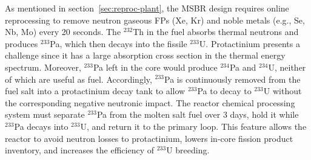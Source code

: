 As mentioned in section~\ref{sec:reproc-plant}, the \gls{MSBR} design 
requires online reprocessing to remove neutron gaseous \glspl{FP} (Xe, Kr) and 
noble metals (e.g., Se, Nb, Mo) every 20 seconds.  The $^{232}$Th in the fuel 
absorbs thermal neutrons and produces $^{233}$Pa, which then decays into the 
fissile $^{233}$U. Protactinium presents a challenge since it has a large 
absorption cross section in the thermal energy spectrum. Moreover, $^{233}$Pa 
left in the core would produce $^{234}$Pa and $^{234}$U, neither of which are 
useful as fuel. Accordingly, $^{233}$Pa is continuously removed from the fuel 
salt into a protactinium decay tank to allow $^{233}$Pa to decay to $^{233}$U 
without the corresponding negative neutronic impact. The reactor chemical 
processing system must separate $^{233}$Pa from the molten salt fuel over 3 
days, hold it while $^{233}$Pa decays into $^{233}$U, and return it to 
the primary loop. This feature allows the reactor to avoid neutron losses to 
protactinium, lowers in-core fission product inventory, and increases the 
efficiency of $^{233}$U breeding.

